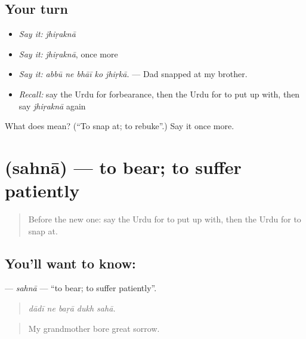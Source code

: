 \subsection*{Your turn}
\begin{itemize}
\raggedright
  \item \emph{Say it:} \emph{jhiṛaknā}
  \item \emph{Say it:} \emph{jhiṛaknā}, once more
  \item \emph{Say it:} \emph{abbū ne bhāī ko jhiṛkā.} — Dad snapped at my brother.
  \item \emph{Recall:} say the Urdu for forbearance, then the Urdu for to put up with, then say \emph{jhiṛaknā} again
\end{itemize}

\begin{tcolorbox}[breakable,colback=teal!4,colframe=teal!35!black,title={Before you move on}]
What does  mean? (\textquotedblleft{}To snap at; to rebuke\textquotedblright{}.) Say it once more.
\end{tcolorbox}
\section[\texorpdfstring{\ur{سہنا} (sahnā)}{سہنا (sahnā)}]{ (sahnā) — to bear; to suffer patiently}

\label{lesson:UR-C458-sahna}



\begin{quote}
Before the new one: say the Urdu for to put up with, then the Urdu for to snap at.
\end{quote}

\subsection*{You'll want to know: }
\textbf{} — \emph{sahnā} — \textquotedblleft{}to bear; to suffer patiently\textquotedblright{}.

\begin{quote}
    
\end{quote}

\begin{quote}
\emph{dādī ne baṛā dukh sahā.}
\end{quote}

\begin{quote}
My grandmother bore great sorrow.
\end{quote}


